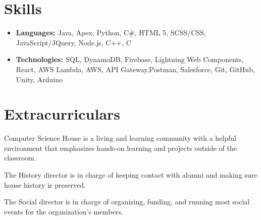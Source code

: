 \documentclass[a4paper]{comcv}
\begin{document}
\section{Skills}
\begin{itemize}
    \item {\bf{Languages: }}  {Java, Apex, Python, C\#, HTML 5, SCSS/CSS, JavaScript/JQuery, Node.js, C++, C} %
    \item {\bf{Technologies: }} {SQL, DynamoDB, Firebase, Lightning Web Components, React, AWS Lambda, AWS, API Gateway,\newline Postman, Salesforce, Git, GitHub, Unity, Arduino}
\end{itemize}


\section{Extracurriculars}
\smallskip
\begin{tightlist}
    \item Computer Science House is a living and learning community with a helpful environment that emphasizes hands-on learning and projects outside of the classroom.

    \item  The History director is in charge of keeping contact with alumni and making sure house history is preserved.

    \item The Social director is in charge of organizing, funding, and running most social events for the organization’s members.

\end{tightlist}
\end{document}
